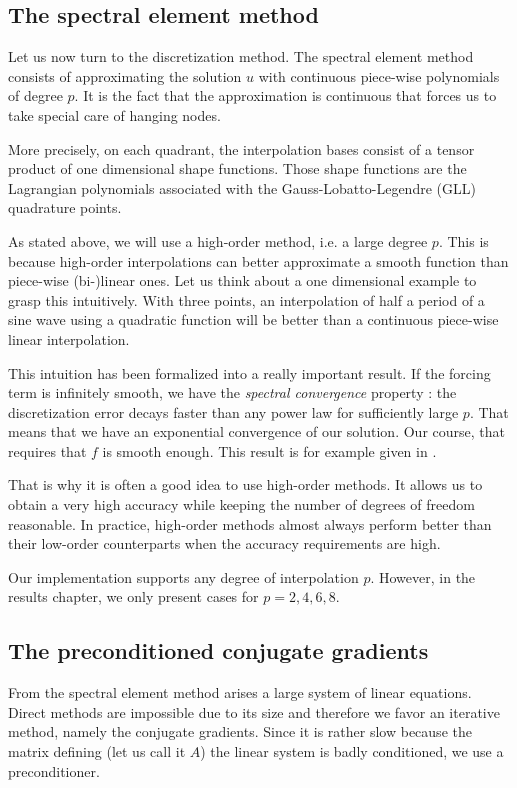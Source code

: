 \subsection*{The spectral element method}

Let us now turn to the discretization method. The spectral element method consists of approximating the solution $u$ with continuous piece-wise polynomials of degree $p$. It is the fact that the approximation is continuous that forces us to take special care of hanging nodes. 

More precisely, on each quadrant, the interpolation bases consist of a tensor product of one dimensional shape functions. Those shape functions are the Lagrangian polynomials associated with the Gauss-Lobatto-Legendre (GLL) quadrature points. 

As stated above, we will use a high-order method, i.e. a large degree $p$. This is because high-order interpolations can better approximate a smooth function than piece-wise (bi-)linear ones. Let us think about a one dimensional example to grasp this intuitively. With three points, an interpolation of half a period of a sine wave using a quadratic function will be better than a continuous piece-wise linear interpolation. 

This intuition has been formalized into a really important result. If the forcing term is infinitely smooth, we have the \textit{spectral convergence} property : the discretization error decays faster than any power law for sufficiently large $p$. That means that we have an exponential convergence of our solution. Our course, that requires that $f$  is smooth enough. This result is for example given in \cite{expConv}.

That is why it is often a good idea to use high-order methods. It allows us to obtain a very high accuracy while keeping the number of degrees of freedom reasonable. In practice, high-order methods almost always perform better than their low-order counterparts when the accuracy requirements are high.   

Our implementation supports any degree of interpolation $p$. However, in the results chapter, we only present cases for $p=2,4,6,8$. 

\subsection*{The preconditioned conjugate gradients}

From the spectral element method arises a large system of linear equations. Direct methods are impossible due to its size and therefore we favor an iterative method, namely the conjugate gradients. Since it is rather slow because the matrix defining (let us call it $A$) the linear system is badly conditioned, we use a preconditioner. 

